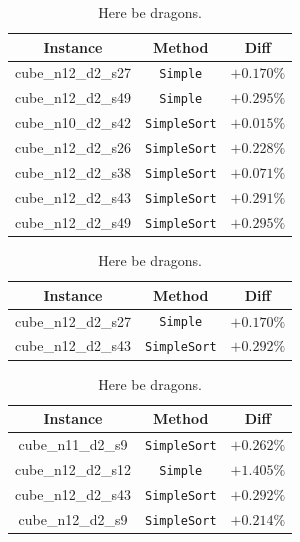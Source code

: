 \begin{table}[htbp]
  \centering
  \begin{tabular}{ccc}
    \toprule
    Instance           & Method              & Diff       \\
    \midrule
    cube\_n12\_d2\_s27 & \texttt{Simple}     & $+0.170\%$ \\
    cube\_n12\_d2\_s49 & \texttt{Simple}     & $+0.295\%$ \\
    cube\_n10\_d2\_s42 & \texttt{SimpleSort} & $+0.015\%$ \\
    cube\_n12\_d2\_s26 & \texttt{SimpleSort} & $+0.228\%$ \\
    cube\_n12\_d2\_s38 & \texttt{SimpleSort} & $+0.071\%$ \\
    cube\_n12\_d2\_s43 & \texttt{SimpleSort} & $+0.291\%$ \\
    cube\_n12\_d2\_s49 & \texttt{SimpleSort} & $+0.295\%$ \\
    \bottomrule
  \end{tabular}
  \caption[$r > 5e-4*q$]{Here be dragons.}
\end{table}

\begin{table}[htbp]
  \centering
  \begin{tabular}{ccc}
    \toprule
    Instance           & Method              & Diff       \\
    \midrule
    cube\_n12\_d2\_s27 & \texttt{Simple}     & $+0.170\%$ \\
    cube\_n12\_d2\_s43 & \texttt{SimpleSort} & $+0.292\%$ \\
    \bottomrule
  \end{tabular}
  \caption[$r > 5e-2*q$]{Here be dragons.}
\end{table}

\begin{table}[htbp]
  \centering
  \begin{tabular}{ccc}
    \toprule
    Instance           & Method              & Diff       \\
    \midrule
    cube\_n11\_d2\_s9  & \texttt{SimpleSort} & $+0.262\%$ \\
    cube\_n12\_d2\_s12 & \texttt{Simple}     & $+1.405\%$ \\
    cube\_n12\_d2\_s43 & \texttt{SimpleSort} & $+0.292\%$ \\
    cube\_n12\_d2\_s9  & \texttt{SimpleSort} & $+0.214\%$ \\
    \bottomrule
  \end{tabular}
  \caption[$q - 10*r < \textit{upperBound}$]{Here be dragons.}
\end{table}

